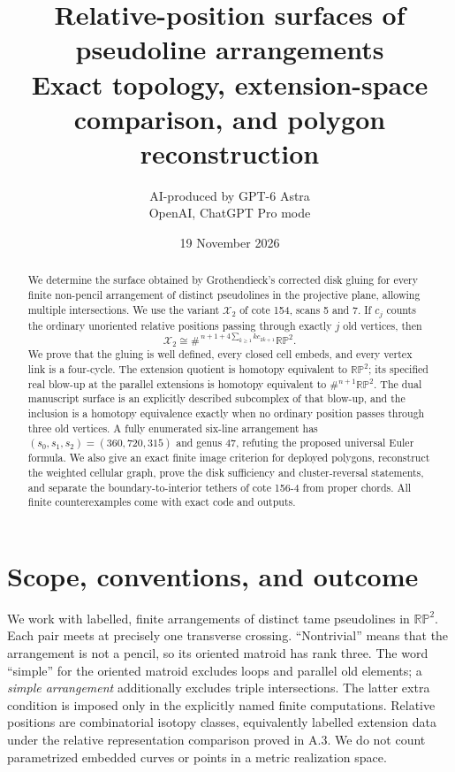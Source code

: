 \documentclass[11pt,a4paper]{article}
\title{Relative-position surfaces of pseudoline arrangements\\[5pt]\large Exact topology, extension-space comparison, and polygon reconstruction}
\author{AI-produced by GPT-6 Astra\\OpenAI, ChatGPT Pro mode}
\date{19 November 2026}
\begin{document}
\maketitle
\begin{abstract}
We determine the surface obtained by Grothendieck's corrected disk gluing
for every finite non-pencil arrangement of distinct pseudolines in the
projective plane, allowing multiple intersections. We use the variant
$\mathcal X_2$ of cote 154, scans 5 and 7. If $c_j$ counts the ordinary
unoriented relative positions passing through exactly $j$ old vertices,
then
\[
 \mathcal X_2\cong
 \#^{\,n+1+4\sum_{k\ge1}k c_{2k+1}}\mathbb {RP}^{2}.
\]
We prove that the gluing is well defined, every closed cell embeds,
and every vertex link is a four-cycle. The extension quotient is
homotopy equivalent to $\mathbb {RP}^{2}$; its specified real blow-up
at the parallel extensions is homotopy equivalent to
$\#^{n+1}\mathbb {RP}^{2}$. The dual manuscript surface is an explicitly
described subcomplex of that blow-up, and the inclusion is a homotopy
equivalence exactly when no ordinary position passes through three old
vertices. A fully enumerated six-line arrangement has
$(s_0,s_1,s_2)=(360,720,315)$ and genus 47, refuting the proposed
universal Euler formula. We also give an exact finite image criterion
for deployed polygons, reconstruct the weighted cellular graph,
prove the disk sufficiency and cluster-reversal statements, and
separate the boundary-to-interior tethers of cote 156-4 from proper
chords. All finite counterexamples come with exact code and outputs.
\end{abstract}

\tableofcontents
\newpage
\section*{Scope, conventions, and outcome}
We work with labelled, finite arrangements of distinct tame pseudolines
in $\mathbb {RP}^{2}$. Each pair meets at precisely one transverse
crossing. ``Nontrivial'' means that the arrangement is not a pencil,
so its oriented matroid has rank three. The word ``simple'' for the
oriented matroid excludes loops and parallel old elements; a
\emph{simple arrangement} additionally excludes triple intersections.
The latter extra condition is imposed only in the explicitly named
finite computations. Relative positions are combinatorial isotopy
classes, equivalently labelled extension data under the relative
representation comparison proved in A.3. We do not count parametrized
embedded curves or points in a metric realization space.
\end{document}
